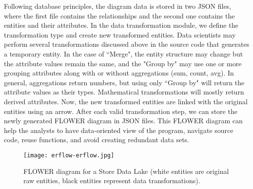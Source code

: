 \documentclass[sigconf,edbt]{acmart-edbt-workshops}
\newcommand{\+}{\discretionary{\mbox{${\bm\cdot}\mkern-1mu$}}{}{}}
\begin{document}
Following database principles,
the diagram data is stored in two JSON files, 
where the first file contains the relationships and the second one contains the entities and their attributes. 
In the data transformation module, we define the transformation type and create new transformed entities. 
Data scientists 
may perform several transformations discussed above in the source code that generates a temporary entity. 
In the case of ``Merge", the entity structure may change but the attribute values remain the same, and the "Group by" may use one or more grouping attributes along with or without aggregations (sum, count, avg).
In general, aggregations return numbers, 
but using only ``Group by" will return the attribute values as their types.
Mathematical transformations will mostly return derived attributes.
Now, the new transformed entities are linked with the original entities using an arrow. 
After each valid transformation step, we can store the newly generated FLOWER diagram in JSON files.
This FLOWER diagram can help the analysts to have data-oriented view of the program, navigate source code, reuse functions, and avoid creating redundant data sets.

\begin{figure*}[t]
  \centering
\texttt{[image: erflow-erflow.jpg]}
  \caption{FLOWER diagram for a Store Data Lake (white entities are 
original raw entities, black entities represent data transformations).}
  \label{fig:erflow}
\end{figure*}
\end{document}
